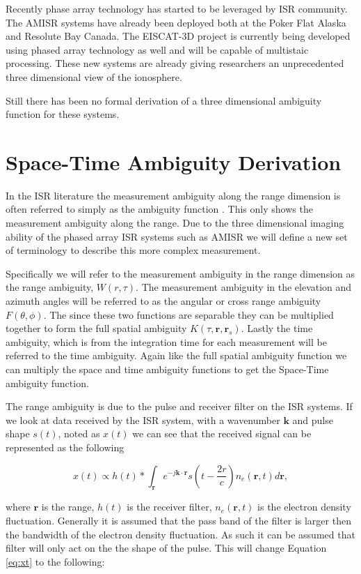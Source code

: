 \documentclass[10pt]{article}
\begin{document}
Recently phase array technology has started to be leveraged by ISR community. The AMISR systems have already been deployed both at the Poker Flat Alaska and Resolute Bay Canada. The EISCAT-3D project is currently being developed using phased array technology as well and will be capable of multistaic processing. These new systems are already giving researchers an unprecedented three dimensional view of the ionosphere.

Still there has been no formal derivation of a three dimensional ambiguity function for these systems.
\section{Space-Time Ambiguity Derivation}

In the ISR literature the measurement ambiguity along the range dimension is often referred to simply as the ambiguity function \cite{hysell2008}. This only shows the measurement ambiguity along the range. Due to the three dimensional imaging ability of the phased array ISR systems such as AMISR we will define a new set of terminology to describe this more complex measurement.

Specifically we will refer to the measurement ambiguity in the range dimension as the range ambiguity, $W(r,\tau)$. The measurement ambiguity in the elevation and azimuth angles will be referred to as the angular or cross range  ambiguity $F(\theta,\phi)$. The since these two functions are separable they can be multiplied together to form the full spatial ambiguity $K(\tau,\mathbf{r},\mathbf{r}_s)$. Lastly the time ambiguity, which is from the integration time for each measurement will be referred to the time ambiguity. Again like the full spatial ambiguity function we can multiply the space and time ambiguity functions to get the Space-Time ambiguity function.%

The range ambiguity is due to the pulse and receiver filter on the ISR systems.  If we look at data received by the ISR system, with a wavenumber $\mathbf{k}$ and pulse shape $s(t)$, noted as $x(t)$ we can see that the received signal can be represented as the following

\begin{equation}
\label{eq:xt}
x(t) \propto h(t) \ast \int_{\mathbf{r}} e^{-j\mathbf{k} \cdot \mathbf{r}}  s(t-\frac{2r}{c}) n_e(\mathbf{r},t) d\mathbf{r},
\end{equation}

\noindent where $\mathbf{r}$ is the range, $h(t)$ is the receiver filter, $n_e(\mathbf{r},t)$ is the electron density fluctuation.  Generally it is assumed that the pass band of the filter is larger then the bandwidth of the electron density fluctuation\cite{kudeki:notes}.  As such it can  be assumed that filter will only act on the the shape of the pulse.   This will change Equation \ref{eq:xt} to the following:
\end{document}
